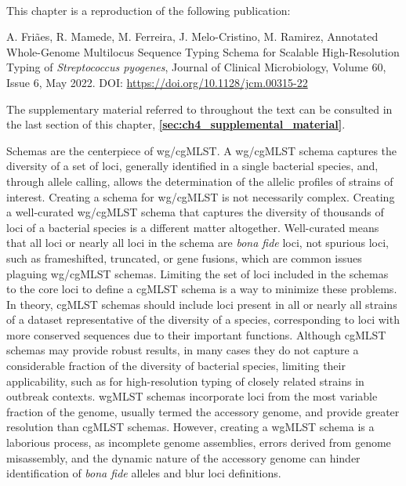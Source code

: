 \mbox{}\\
\vspace{8cm}

This chapter is a reproduction of the following publication:

A. Friães, R. Mamede, M. Ferreira, J. Melo-Cristino, M. Ramirez, Annotated Whole-Genome Multilocus Sequence Typing Schema for Scalable High-Resolution Typing of \textit{Streptococcus pyogenes}, Journal of Clinical Microbiology, Volume 60, Issue 6, May 2022. DOI: \url{https://doi.org/10.1128/jcm.00315-22}

The supplementary material referred to throughout the text can be consulted in the last section of this chapter, \textbf{\autoref{sec:ch4_supplemental_material}}.

Schemas are the centerpiece of \ac{wg/cgMLST}. A \ac{wg/cgMLST} schema captures the diversity of a set of loci, generally identified in a single bacterial species, and, through allele calling, allows the determination of the allelic profiles of strains of interest. Creating a schema for \ac{wg/cgMLST} is not necessarily complex. Creating a well-curated \ac{wg/cgMLST} schema that captures the diversity of thousands of loci of a bacterial species is a different matter altogether. Well-curated means that all loci or nearly all loci in the schema are \textit{bona fide} loci, not spurious loci, such as frameshifted, truncated, or gene fusions, which are common issues plaguing \ac{wg/cgMLST} schemas. Limiting the set of loci included in the schemas to the core loci to define a \ac{cgMLST} schema is a way to minimize these problems. In theory, \ac{cgMLST} schemas should include loci present in all or nearly all strains of a dataset representative of the diversity of a species, corresponding to loci with more conserved sequences due to their important functions. Although \ac{cgMLST} schemas may provide robust results, in many cases they do not capture a considerable fraction of the diversity of bacterial species, limiting their applicability, such as for high-resolution typing of closely related strains in outbreak contexts. \ac{wgMLST} schemas incorporate loci from the most variable fraction of the genome, usually termed the accessory genome, and provide greater resolution than \ac{cgMLST} schemas. However, creating a \ac{wgMLST} schema is a laborious process, as incomplete genome assemblies, errors derived from genome misassembly, and the dynamic nature of the accessory genome can hinder identification of \textit{bona fide} alleles and blur loci definitions.

